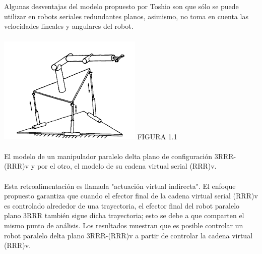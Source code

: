 \documentclass[12pt,a4paper]{article}
\begin{document}
\\\\
Algunas desventajas del modelo propuesto por Toshio son que sólo se puede utilizar en robots seriales redundantes planos, asimismo, no toma en cuenta las velocidades lineales y angulares del robot.
\\\\
\includegraphics[scale=1]{POSTURA DEL ROBOT 3RRR.png} 
FIGURA 1.1
\\\\
El modelo de un manipulador paralelo delta plano de configuración 3RRR-(RRR)v y por el otro, el modelo de su cadena virtual serial (RRR)v. 
\\\\
Esta retroalimentación es llamada "actuación virtual indirecta". El enfoque propuesto garantiza que cuando el efector final de la cadena virtual serial (RRR)v es controlado alrededor de una trayectoria, el efector final del robot paralelo plano 3RRR también sigue dicha trayectoria; esto se debe a que comparten el mismo punto de análisis. Los resultados muestran que es posible controlar un robot paralelo delta plano 3RRR-(RRR)v a partir de controlar la cadena virtual (RRR)v.
\end{document}
